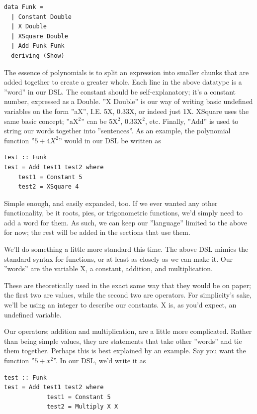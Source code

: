 \begin{verbatim}
data Funk =
  | Constant Double
  | X Double
  | XSquare Double
  | Add Funk Funk
  deriving (Show)
\end{verbatim}

The essence of polynomials is to split an expression into smaller chunks that are added together to create a greater whole. Each line in the above datatype is a ''word'' in our DSL. The constant should be self-explanatory; it's a constant number, expressed as a Double. ''X Double'' is our way of writing basic undefined variables on the form ''aX'', I.E. 5X, 0.33X, or indeed just 1X. XSquare uses the same basic concept; ''aX$^2$'' can be 5X$^2$, 0.33X$^2$, etc.
Finally, ''Add'' is used to string our words together into ''sentences''. As an example, the polynomial function ''$5 + 4X^2$'' would in our DSL be written as
\begin{verbatim}
test :: Funk
test = Add test1 test2 where
    test1 = Constant 5
    test2 = XSquare 4
\end{verbatim}

Simple enough, and easily expanded, too. If we ever wanted any other functionality, be it roots, pies, or trigonometric functions, we'd simply need to add a word for them. As such, we can keep our ''language'' limited to the above for now; the rest will be added in the sections that use them.

\iffalse
We'll do something a little more standard this time. The above DSL mimics the standard syntax for functions, or at least as closely as we can make it. Our ''words'' are the variable X, a constant, addition, and multiplication.

These are theoretically used in the exact same way that they would be on paper; the first two are values, while the second two are operators. For simplicity's sake, we'll be using an integer to describe our constants. X is, as you'd expect, an undefined variable.

Our operators; addition and multiplication, are a little more complicated. Rather than being simple values, they are statements that take other ''words'' and tie them together. Perhaps this is best explained by an example. Say you want the function ''$5 + x^2$''. In our DSL, we'd write it as
\begin{verbatim}
test :: Funk
test = Add test1 test2 where 
            test1 = Constant 5
            test2 = Multiply X X
\end{verbatim}

